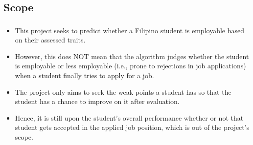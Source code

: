 \subsection{Scope}
\begin{frame}
\frametitle{\subsecname}
	\begin{itemize}
		\item This project seeks to predict whether a Filipino student is employable based on their assessed traits.
		\item However, this does NOT mean that the algorithm judges whether the student is employable or less employable (i.e., prone to rejections in job applications) when a student finally tries to apply for a job.
		\item The project only aims to seek the weak points a student has so that the student has a chance to improve on it after evaluation.
		\item Hence, it is still upon the student's overall performance whether or not that student gets accepted in the applied job position, which is out of the project's scope.
	\end{itemize}
\end{frame}
